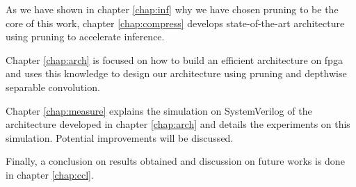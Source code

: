 As we have shown in chapter \ref{chap:inf} why we have chosen pruning to be the core of this work, chapter \ref{chap:compress} develops state-of-the-art architecture using pruning to accelerate inference.

Chapter \ref{chap:arch} is focused on how to build an efficient architecture on \acrshort{fpga} and uses this knowledge to design our architecture using pruning and depthwise separable convolution.

Chapter \ref{chap:measure} explains the simulation on SystemVerilog of the architecture developed in chapter \ref{chap:arch} and details the experiments on this simulation. Potential improvements will be discussed.

Finally, a conclusion on results obtained and discussion on future works is done in chapter \ref{chap:ccl}.

\afterpage{\blankpage}
\cleardoublepage
\newpage
